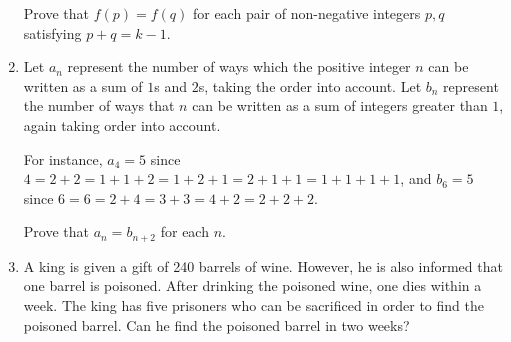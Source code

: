 \documentclass[12pt]{article}
\begin{document}
\begin{enumerate}
	\noindent Prove that $f(p)=f(q)$ for each pair of non-negative integers $p,q$ satisfying $p+q=k-1$.
	\item Let $a_n$ represent the number of ways which the positive integer $n$ can be written as a sum of $1$s and $2$s, taking the order into account. Let $b_n$ represent the number of ways that $n$ can be written as a sum of integers greater than $1$, again taking order into account.
	
	\vspace{2mm}
	
	\noindent For instance, $a_4=5$ since $4=2+2=1+1+2=1+2+1=2+1+1=1+1+1+1$, and $b_6=5$ since $6=6=2+4=3+3=4+2=2+2+2$.
	
	\vspace{2mm}
	
	\noindent Prove that $a_n=b_{n+2}$ for each $n$.
	\item A king is given a gift of 240 barrels of wine. However, he is also informed that one barrel is poisoned. After drinking the poisoned wine, one dies within a week. The king has five prisoners who can be sacrificed in order to find the poisoned barrel. Can he find the poisoned barrel in two weeks?
\end{enumerate}
\end{document}

